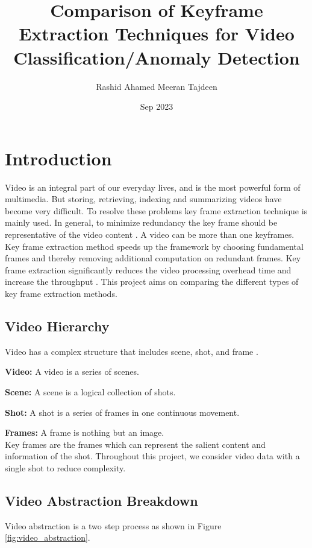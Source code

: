\documentclass[rnd]{mas_proposal}
\title{Comparison of Keyframe Extraction Techniques for Video Classification/Anomaly Detection}
\author{Rashid Ahamed Meeran Tajdeen}
\date{Sep 2023}
\begin{document}
\maketitle

\pagestyle{plain}

\section{Introduction}
    
Video is an integral part of our everyday lives, and is the most powerful form of multimedia. But storing, retrieving, indexing and summarizing videos have become very difficult. To resolve these problems key frame extraction technique is mainly used. In general, to minimize redundancy the key frame should be representative of the video content \cite{Sadiq2020}. A video can be more than one keyframes. Key frame extraction method speeds up the framework by choosing fundamental frames and thereby removing additional computation on redundant frames. Key frame extraction significantly reduces the video processing overhead time and increase the throughput \cite{Ragavan2020}. This project aims on comparing the different types of key frame extraction methods.

\subsection{Video Hierarchy}

Video has a complex structure that includes scene, shot, and frame \cite{Ragavan2020}.

\quad \textbf{Video:} A video is a series of scenes.

\quad \textbf{Scene:} A scene is a logical collection of shots.

\quad \textbf{Shot:} A shot is a series of frames in one continuous movement.

\quad \textbf{Frames:} A frame is nothing but an image.
\\
Key frames are the frames which can represent the salient content and information of the shot. Throughout this project, we consider video data with a single shot to reduce complexity.

\subsection{Video Abstraction Breakdown}

Video abstraction is a two step process as shown in Figure \ref{fig:video_abstraction}.
\end{document}
